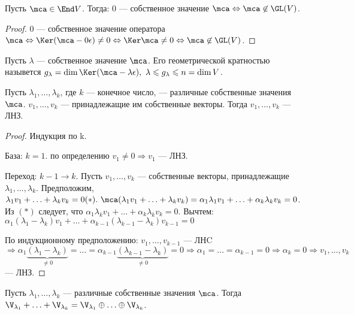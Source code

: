 \documentclass[main]{subfiles}
\begin{document}
\begin{lemma}
    Пусть $\mca \in \End V$. Тогда: 0 — собственное значение $\mca  
    \Leftrightarrow \mca \not\in \GL(V)$.
\end{lemma}

\begin{proof}
    0 — собственное значение оператора $\mca \Leftrightarrow
    \Ker (\mca - 0\epsilon) \neq 0 \Leftrightarrow
    \Ker \mca \neq 0 \Leftrightarrow \mca \not\in \GL(V)$.
\end{proof}

\begin{definition}
    Пусть $\lambda$ — собственное значение $\mca$. 
    Его геометрической кратностью назывется 
    $g_\lambda = \dim \Ker (\mca -\lambda\epsilon),\ \lambda \leqslant g_\lambda \leqslant n = \dim V$.
\end{definition}

\begin{proposition}
    Пусть $\lambda_1, \ldots, \lambda_k$, где $k$ — конечное число, — различные собственные значения $\mca$.
    $v_1, \ldots, v_k$ — принадлежащие им собственные векторы.
    Тогда  $v_1, \ldots, v_k$ — ЛНЗ.
\end{proposition}

\begin{proof}
    Индукция по k.

    База: $k = 1$.  по определению $v_1 \neq 0 \Rightarrow v_1$ — ЛНЗ.

    Переход: $k-1 \rightarrow k$. Пусть $v_1, \ldots, v_k$  — собственные 
    векторы, принадлежащие $\lambda_1, \ldots, \lambda_k$.
    Предположим, $\lambda_1 v_1 + \ldots + \lambda_k v_k = 0 (*).\
    \mca(\lambda_1 v_1 + \ldots + \lambda_k v_k) = 
    \alpha_1 \lambda_1 v_1 + \ldots + \alpha_k \lambda_k v_k = 0$. Из $(*)$ следует, что
    $\alpha_1 \lambda_k v_1 + \ldots + \alpha_k \lambda_k v_k = 0$. 
    Вычтем: $\alpha_1(\lambda_1 - \lambda_k)v_1 + \ldots + \alpha_{k-1}(\lambda_{k-1} - \lambda_k)v_{k-1} = 0$

    По индукционному предположению: $v_1, \ldots, v_{k-1}$ — ЛНC
    $\Rightarrow \alpha_1\underbrace{(\lambda_1 - \lambda_k)}_{\neq 0} = \ldots = 
    \alpha_{k-1}\underbrace{(\lambda_{k-1} - \lambda_k)}_{\neq 0} = 0 \Rightarrow
    \alpha_1 = \ldots = \alpha_{k-1} = 0 \Rightarrow \alpha_k = 0 \Rightarrow
    v_1, \ldots, v_k$ — ЛНЗ.
\end{proof}

\begin{corollary}
    Пусть $\lambda_1, \ldots, \lambda_k$ — различные собственные значения $\mca$.
    Тогда   $\V_{\lambda_1} + \ldots + \V_{\lambda_k} =
    \V_{\lambda_1} \oplus \ldots \oplus  \V_{\lambda_k}$.
\end{corollary}
\end{document}
